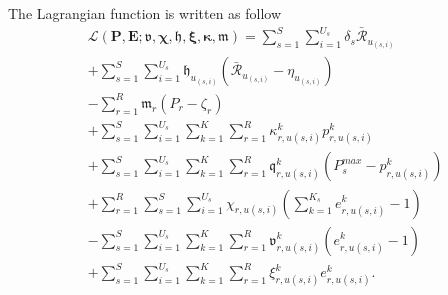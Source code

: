 \documentclass[conference]{IEEEtran}
\begin{document}
The Lagrangian function is written as follow
\begin{subequations}\label{lagrang}
\begin{alignat}{4}
&\mathcal{L}(\boldsymbol{P},\boldsymbol{E}; \boldsymbol{\mathfrak{v}}, \boldsymbol{\chi}, \boldsymbol{\mathfrak{h}}, \boldsymbol{ \xi}, \boldsymbol{ \kappa}, \boldsymbol{\mathfrak{m}})  = \sum\limits_{s=1}^{S} \sum\limits_{i=1}^{U_s}\delta_s\mathcal{\bar{R}}_{u_{(s,i)}}\\
&+\sum\limits_{s=1}^{S} \sum\limits_{i=1}^{U_s}\mathfrak{h}_{u_{(s,i)}} (\mathcal{\bar{R}}_{u_{(s,i)}}-\eta_{u_{(s,i)}})\\
&-  \sum\limits_{r=1}^{R} \mathfrak{m}_{r} (P_{r}- \zeta_r)\\
&+  \sum\limits_{s=1}^{S} \sum\limits_{i=1}^{U_s}\sum\limits_{k=1}^{K} \sum\limits_{r=1}^{R}\kappa^k_{r,u(s,i)}  p^k_{r,u(s,i)}\\
&+  \sum\limits_{s=1}^{S} \sum\limits_{i=1}^{U_s}\sum\limits_{k=1}^{K} \sum\limits_{r=1}^{R}\mathfrak{q}^k_{r,u(s,i)} (P^{max}_{s}- p^k_{r,u(s,i)})\\
&+ \sum\limits_{r=1}^{R}\sum\limits_{s=1}^{S} \sum\limits_{i=1}^{U_s}\chi_{r,u(s,i)}(\sum_{k =1}^{K_s} e^{k}_{r,u(s,i)} -1)\\
&-  \sum\limits_{s=1}^{S} \sum\limits_{i=1}^{U_s}\sum\limits_{k=1}^{K} \sum\limits_{r=1}^{R}\mathfrak{v}^{k}_{r,u(s,i)} (e^{k}_{r,u(s,i)} -1)\\
&+  \sum\limits_{s=1}^{S} \sum\limits_{i=1}^{U_s}\sum\limits_{k=1}^{K} \sum\limits_{r=1}^{R} \xi^{k}_{r,u(s,i)} e^{k}_{r,u(s,i)}.
\end{alignat}
\end{subequations}
\end{document}
